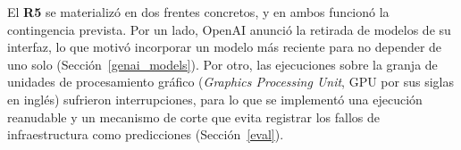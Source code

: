 El \textbf{R5} se materializó en dos frentes concretos, y en ambos funcionó la
contingencia prevista. Por un lado, OpenAI anunció la retirada de modelos de su
interfaz, lo que motivó incorporar un modelo más reciente para no depender de uno
solo (Sección~\ref{genai_models}). Por otro, las ejecuciones sobre la granja
de unidades de procesamiento gráfico (\textit{Graphics Processing Unit}, GPU por sus
siglas en inglés) sufrieron interrupciones, para lo que se implementó una ejecución reanudable y
un mecanismo de corte que evita registrar los fallos de infraestructura como
predicciones (Sección~\ref{eval}).


\newpage